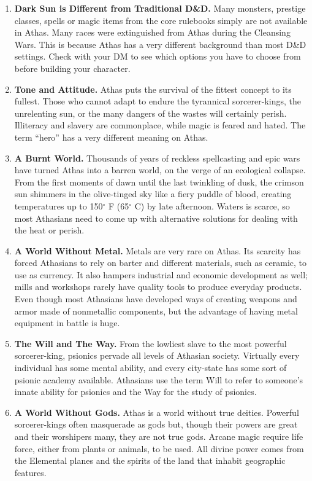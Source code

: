 \begin{enumerate}
\item \textbf{{\tableheader Dark Sun} is Different from Traditional D\&D.} Many monsters, prestige classes, spells or magic items from the core rulebooks simply are not available in Athas. Many races were extinguished from Athas during the Cleansing Wars. This is because Athas has a very different background than most D\&D settings. Check with your DM to see which options you have to choose from before building your character.
\item \textbf{Tone and Attitude.} Athas puts the survival of the fittest concept to its fullest. Those who cannot adapt to endure the tyrannical sorcerer-kings, the unrelenting sun, or the many dangers of the wastes will certainly perish. Illiteracy and slavery are commonplace, while magic is feared and hated. The term ``hero'' has a very different meaning on Athas.
\item \textbf{A Burnt World.} Thousands of years of reckless spellcasting and epic wars have turned Athas into a barren world, on the verge of an ecological collapse. From the first moments of dawn until the last twinkling of dusk, the crimson sun shimmers in the olive-tinged sky like a fiery puddle of blood, creating temperatures up to 150$^\circ$ F (65$^\circ$ C) by late afternoon. Waters is scarce, so most Athasians need to come up with alternative solutions for dealing with the heat or perish.
\item \textbf{A World Without Metal.} Metals are very rare on Athas. Its scarcity has forced Athasians to rely on barter and different materials, such as ceramic, to use as currency. It also hampers industrial and economic development as well; mills and workshops rarely have quality tools to produce everyday products. Even though most Athasians have developed ways of creating weapons and armor made of nonmetallic components, but the advantage of having metal equipment in battle is huge.
\item \textbf{The Will and The Way.} From the lowliest slave to the most powerful sorcerer-king, psionics pervade all levels of Athasian society. Virtually every individual has some mental ability, and every city-state has some sort of psionic academy available. Athasians use the term Will to refer to someone's innate ability for psionics and the Way for the study of psionics.
\item \textbf{A World Without Gods.} Athas is a world without true deities. Powerful sorcerer-kings often masquerade as gods but, though their powers are great and their worshipers many, they are not true gods. Arcane magic require life force, either from plants or animals, to be used. All divine power comes from the Elemental planes and the spirits of the land that inhabit geographic features.

\end{enumerate}
